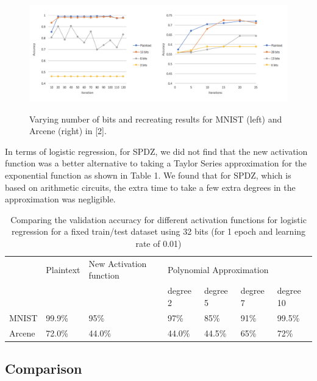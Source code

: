 \documentclass{article}
\begin{document}
\begin{figure}[h!]
\centering
  \includegraphics[scale=0.6]{mnistarcene.png}
  \label{fig:result4}
   \caption{Varying number of bits and recreating results for MNIST (left) and Arcene (right) in [2].}
\end{figure}

In terms of logistic regression, for SPDZ, we did not find that the new activation function was a better alternative to taking a Taylor Series approximation for the exponential function as shown in Table 1. We found that for SPDZ, which is based on arithmetic circuits, the extra time to take a few extra degrees in the approximation was negligible.  

\begin{table}[h!]
\caption{Comparing the validation accuracy for different activation functions for logistic regression for a fixed train/test dataset using 32 bits (for 1 epoch and learning rate of 0.01)}
\centering
\label{my-label}
\begin{tabular}{@{}lllllll@{}}
\toprule
       & Plaintext & New Activation function & \multicolumn{4}{l}{Polynomial Approximation} \\
       &           &                         & degree 2  & degree 5  & degree 7 & degree 10 \\ \midrule
MNIST  & 99.9\%    & 95\%                    & 97\%      & 85\%      & 91\%     & 99.5\%    \\
Arcene & 72.0\%    &           44.0\%              &   44.0\%        &    44.5\%       &    65\%      &    72\%       \\ \bottomrule
\end{tabular}
\end{table}

\subsection{Comparison}
\end{document}
